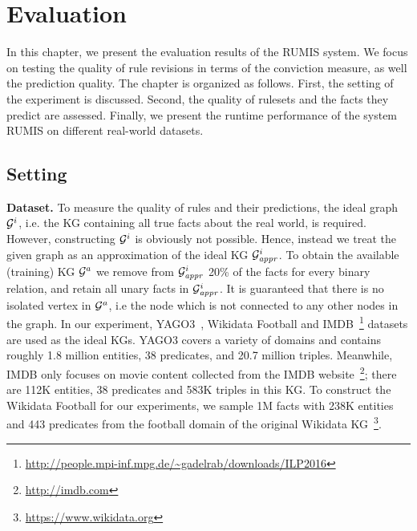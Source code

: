 \chapter{Evaluation}
\label{chap:eval}

In this chapter, we present the evaluation results of the RUMIS system. We focus on testing the quality of rule revisions in terms of the conviction measure, as well the prediction quality. The chapter is organized as follows. First, the setting of the experiment is discussed. Second, the quality of rulesets and the facts they predict are assessed. Finally, we present the runtime performance of the system RUMIS on different real-world datasets.

\section{Setting}

\textbf{Dataset.} To measure the quality of rules and their predictions, the ideal graph $\mathcal{G}^i$, i.e. the KG containing all true facts about the real world, is required. However, constructing $\mathcal{G}^i$ is obviously not possible. Hence, instead we treat the given graph as an approximation of the ideal KG $\mathcal{G}^i_{\mathit{appr}}$. To obtain the available (training) KG $\mathcal{G}^a$ we remove from $\mathcal{G}^i_{\mathit{appr}}$ 20\% of the facts for every binary relation, and retain all unary facts in $\mathcal{G}^i_{\mathit{appr}}$. It is guaranteed that there is no isolated vertex in $\mathcal{G}^a$, i.e the node which is not connected to any other nodes in the graph. In our experiment, YAGO3~\cite{ref28}, Wikidata Football and IMDB~\footnote{\url{http://people.mpi-inf.mpg.de/~gadelrab/downloads/ILP2016}} datasets are used as the ideal KGs. YAGO3 covers a variety of domains and contains roughly 1.8 million entities, 38 predicates, and 20.7 million triples. Meanwhile, IMDB only focuses on movie content collected from the IMDB website~\footnote{\url{http://imdb.com}}; there are 112K entities, 38 predicates and 583K triples in this KG. To construct the Wikidata Football for our experiments, we sample 1M facts with 238K entities and 443 predicates from the football domain of the original Wikidata KG~\footnote{\url{https://www.wikidata.org}}. %

